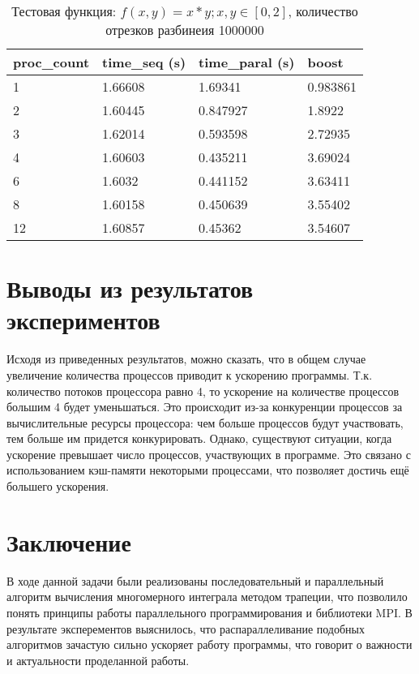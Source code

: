 \documentclass{report}
\begin{document}
\begin{table}[!h]
\centering
\begin{tabular}{| p{2cm} | p{3cm} | p{3cm} | p{2cm} |}
\hline
proc\_count & time\_seq (s) & time\_paral (s) & boost  \\[5pt]
\hline
1        & 1.66608        & 1.69341      & 0.983861  \\
2        & 1.60445        & 0.847927     & 1.8922    \\
3        & 1.62014        & 0.593598     & 2.72935   \\
4        & 1.60603        & 0.435211     & 3.69024   \\
6        & 1.6032         & 0.441152     & 3.63411	 \\
8        & 1.60158        & 0.450639     & 3.55402	 \\
12       & 1.60857        & 0.45362      & 3.54607   \\
\hline
\end{tabular}
\caption{Тестовая функция: $f(x, y) = x*y; x, y \in [0, 2]$, количество отрезков разбинеия 1000000}
\end{table}

\newpage

\section*{Выводы из результатов экспериментов}
\par Исходя из приведенных результатов, можно сказать, что в общем случае увеличение количества процессов приводит к ускорению программы. Т.к. количество потоков процессора равно 4, то ускорение на количестве процессов большим 4 будет уменьшаться. Это происходит из-за конкуренции процессов за вычислительные ресурсы процессора: чем больше процессов будут участвовать, тем больше им придется конкурировать. Однако, существуют ситуации, когда ускорение превышает число процессов, участвующих в программе. Это связано с использованием кэш-памяти некоторыми процессами, что позволяет достичь ещё большего ускорения.

\newpage

\section*{Заключение}
\par В ходе данной задачи были реализованы последовательный и параллельный алгоритм вычисления многомерного интеграла методом трапеции, что позволило понять принципы работы параллельного программирования и библиотеки MPI. В результате эксперементов выяснилось, что распараллеливание подобных алгоритмов зачастую сильно ускоряет работу программы, что говорит о важности и актуальности проделанной работы.
\newpage
\end{document}
